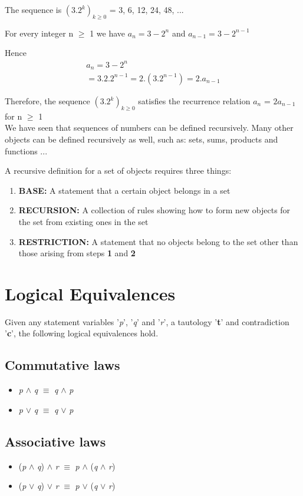 \documentclass{article}
\begin{document}
The sequence is $(3.2^{k})_{k\geq0}$ = 3, 6, 12, 24, 48, ...

For every integer n $\geq$ 1 we have $a_{n} = 3 - 2^{n}$ and $a_{n-1} = 3 - 2^{n-1}$ 

Hence 
\begin{align}
a_{n} = 3 - 2^{n} \\
= 3.2.2^{n-1}
= 2.(3.2^{n-1})
= 2.a_{n-1}
\end{align}

Therefore, the sequence $(3.2^{k})_{k\geq0}$ satisfies the recurrence relation $a_{n}$ = $2a_{n-1}$ for n $\geq$ 1 \\

We have seen that sequences of numbers can be defined recursively. Many other objects can be defined recursively as well, such as: sets, sums, products and functions ...

A recursive definition for a set of objects requires three things:
\begin{enumerate}
\item \textbf{BASE:} A statement that a certain object belongs in a set
\item \textbf{RECURSION:} A collection of rules showing how to form new objects for the set from existing ones in the set
\item \textbf{RESTRICTION:} A statement that no objects belong to the set other than those arising from steps \textbf{1} and \textbf{2}
\end{enumerate}

\section{Logical Equivalences}

Given any statement variables '\textit{p}', '\textit{q}' and '\textit{r}', a tautology '\textbf{t}' and contradiction '\textbf{c}', the following
logical equivalences hold.


\subsection{Commutative laws}
\begin{itemize} 
\item \textit{p} $\wedge$ \textit{q} $\equiv$ \textit{q} $\wedge$ \textit{p}
\item \textit{p} $\lor$ \textit{q} $\equiv$ \textit{q} $\lor$ \textit{p}
\end{itemize}

\subsection{Associative laws}
\begin{itemize}
\item (\textit{p} $\wedge$ \textit{q}) $\wedge$ \textit{r} $\equiv$ \textit{p} $\wedge$ (\textit{q} $\wedge$ \textit{r})
\item (\textit{p} $\lor$ \textit{q}) $\lor$ \textit{r} $\equiv$ \textit{p} $\lor$ (\textit{q} $\lor$ \textit{r})
\end{itemize}
\end{document}
